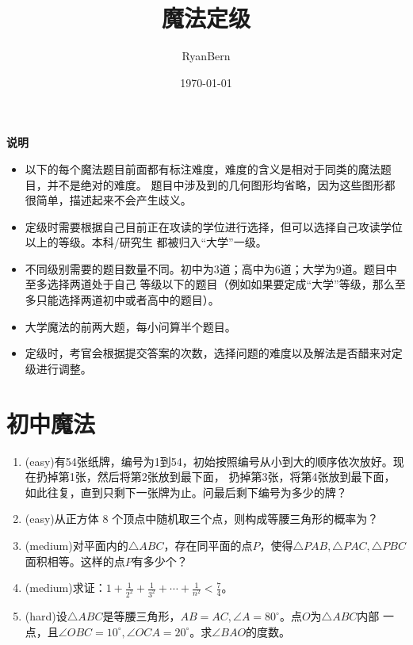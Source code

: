 \documentclass[a4paper]{article}
\title{魔法定级}
\date{\today}
\author{RyanBern}
\begin{document}
\maketitle
\textbf{说明}
\begin{itemize}
\item 以下的每个魔法题目前面都有标注难度，难度的含义是相对于同类的魔法题目，并不是绝对的难度。
题目中涉及到的几何图形均省略，因为这些图形都很简单，描述起来不会产生歧义。
\item 定级时需要根据自己目前正在攻读的学位进行选择，但可以选择自己攻读学位以上的等级。本科/研究生
都被归入“大学”一级。
\item 不同级别需要的题目数量不同。初中为3道；高中为6道；大学为9道。题目中至多选择两道处于自己
等级以下的题目（例如如果要定成“大学”等级，那么至多只能选择两道初中或者高中的题目）。
\item 大学魔法的前两大题，每小问算半个题目。
\item 定级时，考官会根据提交答案的次数，选择问题的难度以及解法是否醋来对定级进行调整。
\end{itemize}

\section{初中魔法}
\begin{enumerate}
\item (easy)有54张纸牌，编号为1到54，初始按照编号从小到大的顺序依次放好。现在扔掉第1张，然后将第2张放到最下面，
扔掉第3张，将第4张放到最下面，如此往复，直到只剩下一张牌为止。问最后剩下编号为多少的牌？
\item (easy)从正方体 8 个顶点中随机取三个点，则构成等腰三角形的概率为？
\item (medium)对平面内的$\triangle ABC$，存在同平面的点$P$，使得$\triangle PAB,\triangle PAC,\triangle PBC$
面积相等。这样的点$P$有多少个？
\item (medium)求证：$1+\frac{1}{2^2}+\frac{1}{3^2}+\cdots + \frac{1}{n^2}<\frac{7}{4}$。
\item (hard)设$\triangle ABC$是等腰三角形，$AB=AC,\angle A=80^\circ$。点$O$为$\triangle ABC$内部
一点，且$\angle OBC=10^\circ,\angle OCA=20^\circ$。求$\angle BAO$的度数。
\end{enumerate}
\end{document}
